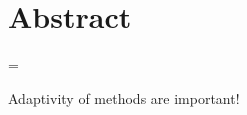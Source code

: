 \chapter*{Abstract}

\emergencystretch=\maxdimen
{}

Adaptivity of methods are important!



%
%
%
%
%
